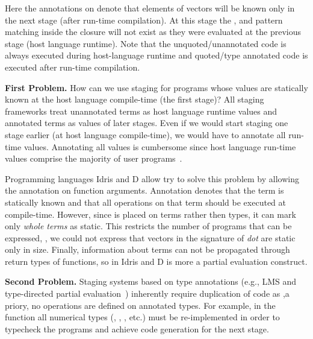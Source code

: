 Here the  annotations on  denote that elements of vectors will be known
 only in the next stage (after run-time compilation). At this stage the 
 , and pattern matching inside the closure will not exist
 as they were evaluated at the previous stage (host language runtime). Note that
 the unquoted/unannotated code is always executed during host-language runtime
 and quoted/type annotated code is executed after run-time compilation.

{\bf First Problem.} How can we use staging for programs whose values are statically
 known at the host language compile-time (the first stage)? All staging frameworks
 treat unannotated terms as host language runtime values and annotated terms as
 values of later stages. Even if we would start staging one stage earlier (at host language compile-time),
 we would have to annotate all run-time values. Annotating all values is cumbersome
 since host language run-time values comprise the majority of user programs~.


Programming languages Idris and D allow try to solve this problem by allowing
 the  annotation on function arguments. Annotation  denotes
 that the term is statically known and that all operations on that term should
 be executed at compile-time. However, since  is placed on terms rather
 then types, it can mark only \emph{whole terms} as static. This restricts the number
 of programs that can be expressed, \eg, we could not express that vectors in the
 signature of \emph{dot} are static only in size. Finally, information about 
 terms can not be propagated through return types of functions, so 
 in Idris and D is more a partial evaluation construct.

{\bf Second Problem.} Staging systems based on type annotations (e.g., LMS and type-directed
partial evaluation~\cite{danvy1999type}) inherently require duplication of code as
,a priory, no operations are defined on  annotated types. For example,
in the  function all numerical types (\eg, , , etc.)
must be re-implemented in order to typecheck the programs and achieve code generation
for the next stage.

